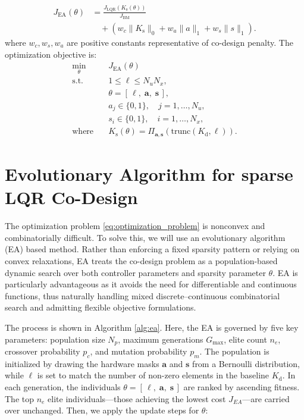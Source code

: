 \documentclass[conference]{IEEEtran}
\begin{document}
\begin{equation}
\label{cost_ea}
\begin{aligned}
J_{\text{EA}}(\theta) 
&= \frac{J_{\text{LQR}}(K_{\text{s}}(\theta))}{J_{\text{BM}}} \\
&\quad + \left(
w_c \|K_{\text{s}}\|_0
+ w_a \|a\|_1
+ w_s \|s\|_1
\right).
\end{aligned}
\end{equation}
where $w_c, w_s, w_a$ are positive constants representative of co-design penalty. The optimization objective is:
\begin{equation}
\begin{aligned}
\min_{\theta} \quad & J_{\text{EA}}(\theta) \\
\text{s.t.} \quad &  1 \leq \ell \leq N_u N_x, \\
&\theta = [\,\ell, \;\mathbf{a}, \;\mathbf{s}\,], \\
& a_j \in \{0, 1\}, \quad j = 1, \dots, N_u, \\
& s_i \in \{0, 1\}, \quad i = 1, \dots, N_x, \\
\text{where} \quad & K_\mathrm{s}(\theta) = \Pi_{\mathbf{a},\mathbf{s}} \left( \text{trunc}(K_{\mathrm{d}}, \ell) \right).
\end{aligned}
\label{eq:optimization_problem}
\end{equation}

\section{Evolutionary Algorithm for sparse LQR Co-Design}
The optimization problem \eqref{eq:optimization_problem} is nonconvex and combinatorially difficult. To solve this, we will use an evolutionary algorithm (EA) based method. Rather than enforcing a fixed sparsity pattern or relying on convex relaxations, EA treats the co-design problem as a population-based dynamic search over both controller parameters and sparsity parameter $\theta$. EA is particularly advantageous as it avoids the need for differentiable and continuous functions, thus naturally handling mixed discrete–continuous combinatorial search and admitting flexible objective formulations. 

The process is shown in Algorithm \ref{alg:ea}. Here, the EA is governed by five key parameters: population size $N_p$, maximum generations $G_{\max}$, elite count $n_e$, crossover probability $p_c$, and mutation probability $p_m$. The population is initialized by drawing the hardware masks $\mathbf{a}$ and $\mathbf{s}$ from a  Bernoulli distribution, while $\ell$ is set to match the number of non-zero elements in the baseline $K_{\mathrm{d}}$. In each generation, the individuals $\theta = [\,\ell, \;\mathbf{a}, \;\mathbf{s}\,]$ are ranked by ascending fitness. The top $n_e$ elite individuals—those achieving the lowest cost $J_{EA}$—are carried over unchanged. Then, we apply the update steps for $\theta$:
\end{document}
